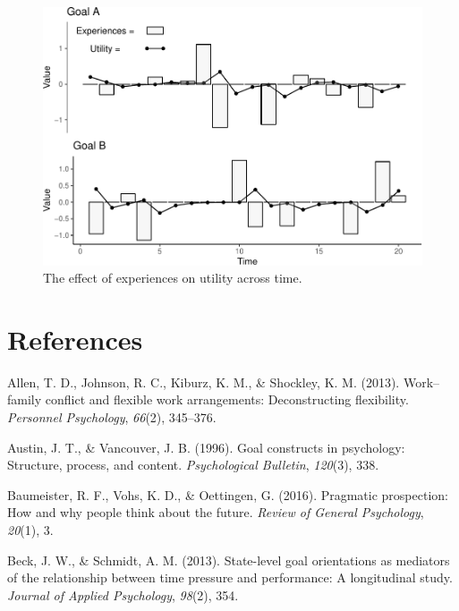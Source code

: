 \documentclass[english,,man]{apa6}
\theoremstyle{definition}
\theoremstyle{definition}
\theoremstyle{definition}
\theoremstyle{remark}
\begin{document}
\begin{figure}
\centering
\includegraphics{figures/Figure2-1.pdf}
\caption{\label{fig:Figure2}The effect of experiences on utility across
time.}
\end{figure}

\newpage

\hypertarget{references}{%
\section{References}\label{references}}

\setlength{\parindent}{-0.5in}
\setlength{\leftskip}{0.5in}

\hypertarget{refs}{}
\leavevmode\hypertarget{ref-allen2013work}{}%
Allen, T. D., Johnson, R. C., Kiburz, K. M., \& Shockley, K. M. (2013).
Work--family conflict and flexible work arrangements: Deconstructing
flexibility. \emph{Personnel Psychology}, \emph{66}(2), 345--376.

\leavevmode\hypertarget{ref-austin1996}{}%
Austin, J. T., \& Vancouver, J. B. (1996). Goal constructs in
psychology: Structure, process, and content. \emph{Psychological
Bulletin}, \emph{120}(3), 338.

\leavevmode\hypertarget{ref-baumeister2016}{}%
Baumeister, R. F., Vohs, K. D., \& Oettingen, G. (2016). Pragmatic
prospection: How and why people think about the future. \emph{Review of
General Psychology}, \emph{20}(1), 3.

\leavevmode\hypertarget{ref-beck2013state}{}%
Beck, J. W., \& Schmidt, A. M. (2013). State-level goal orientations as
mediators of the relationship between time pressure and performance: A
longitudinal study. \emph{Journal of Applied Psychology}, \emph{98}(2),
354.
\end{document}
